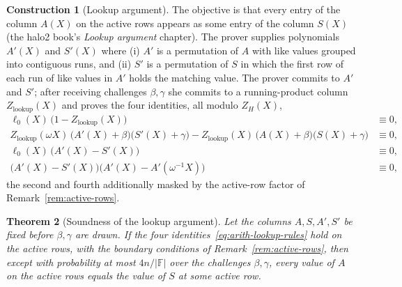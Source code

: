 \documentclass[11pt,a4paper]{article}
\newtheorem{theorem}{Theorem}[section]
\theoremstyle{definition}
\newtheorem{construction}[theorem]{Construction}
\newcommand{\F}{\mathbb{F}}
\newcommand{\ZH}{Z_H}
\begin{document}
\begin{construction}[Lookup argument]\label{con:arith-lookup}
The objective is that every entry of the column $A(X)$ on the active rows
appears as some entry of the column $S(X)$ (the halo2 book's
\emph{Lookup argument} chapter). The prover supplies
polynomials $A'(X)$ and $S'(X)$ where (i) $A'$ is a permutation of $A$
with like values grouped into contiguous runs, and (ii) $S'$ is a
permutation of $S$ in which the first row of each run of like values in
$A'$ holds the matching value. The prover commits to $A'$ and $S'$;
after receiving challenges $\beta, \gamma$ she commits to a
running-product column $Z_{\mathrm{lookup}}(X)$ and proves the four
identities, all modulo $\ZH(X)$,
\begin{equation}\label{eq:arith-lookup-rules}
\begin{aligned}
\ell_0(X)\,\bigl(1 - Z_{\mathrm{lookup}}(X)\bigr) &\equiv 0, \\
Z_{\mathrm{lookup}}(\omega X)\,\bigl(A'(X) + \beta\bigr)\bigl(S'(X)
  + \gamma\bigr)
 - Z_{\mathrm{lookup}}(X)\,\bigl(A(X) + \beta\bigr)\bigl(S(X)
  + \gamma\bigr) &\equiv 0, \\
\ell_0(X)\,\bigl(A'(X) - S'(X)\bigr) &\equiv 0, \\
\bigl(A'(X) - S'(X)\bigr)\bigl(A'(X) - A'(\omega^{-1} X)\bigr) &\equiv 0,
\end{aligned}
\end{equation}
the second and fourth additionally masked by the active-row factor of
Remark~\ref{rem:active-rows}.
\end{construction}

\begin{theorem}[Soundness of the lookup argument]\label{thm:arith-lookup}
Let the columns $A, S, A', S'$ be fixed before $\beta, \gamma$ are
drawn. If the four identities~\eqref{eq:arith-lookup-rules} hold on the
active rows, with the boundary conditions of Remark~\ref{rem:active-rows},
then except with probability at most $4n / |\F|$ over the challenges
$\beta, \gamma$, every value of $A$ on the active rows equals the value
of $S$ at some active row.
\end{theorem}
\end{document}
